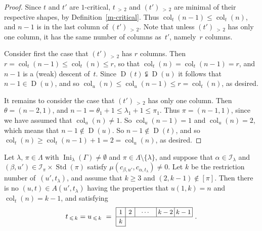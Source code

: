 \documentclass[ALCO,ThmDefs,Unicode,epreuves]{cedram}
\DeclareMathOperator{\Ini}{Ini}
\DeclareMathOperator{\col}{col}
\newcommand{\morethan}[2]{#1\,{_{>\,#2}}}
\newcommand{\Lessthan}[2]{#1\,{_{\leqslant\,#2}}}
\DeclareMathOperator{\STD}{Std}
\DeclareMathOperator{\D}{D}
\begin{document}
\begin{proof}
Since $t$ and $t'$ are $1$-critical, $\morethan t2$ and $\morethan{(t')}2$ are
minimal of their respective shapes, by Definition~\ref{m-critical}. Thus
$\col_t(n-1)\leqslant\col_t(n)$, and $n-1$ is in the last column of $\morethan{(t')}2$.
Note that unless $\morethan{(t')}2$ has only one column, it has the same number of
columns as~$t'$, namely~$r$ columns.

Consider first the case that $\morethan{(t')}2$ has $r$ columns. Then
$r=\col_t(n-1)\leqslant\col_t(n)\leqslant r$, so that $\col_t(n)=\col_t(n-1)=r$,
and $n-1$ is a (weak) descent of~$t$. Since $\D(t)\subsetneqq\D(u)$ it follows that
$n-1\in\D(u)$, and so $\col_u(n)\leqslant\col_u(n-1)\leqslant r=\col_t(n)$,
as desired.

It remains to consider the case that $\morethan{(t')}2$ has only one column.
Then $\theta=(n-2,1)$, and $n-1=\theta_1+1\leqslant\lambda_1+1\leqslant\pi_1$.
Thus $\pi=(n-1,1)$, since we have assumed that $\col_u(n)\ne 1$.
So $\col_u(n-1)=1$ and $\col_u(n)=2$, which means that $n-1\notin\D(u)$.
So $n-1\notin\D(t)$, and so $\col_t(n)\geqslant\col_t(n-1)+1=2=\col_u(n)$,
as desired.
\end{proof}

\begin{lemm}\label{k-minimalonerow}
Let $\lambda,\,\pi\in\Lambda$ with $\Ini_\lambda(\Gamma)\ne\emptyset$ and
$\pi\in\Lambda\setminus\{\lambda\}$, and suppose that $\alpha\in\mathcal I_\lambda$
and $(\beta,u')\in\mathcal I_\pi\times\STD(\pi)$ satisfy
$\mu(c_{\beta,u'},c_{\alpha,t_\lambda})\neq 0$.
Let $k$ be the restriction number of~$(u',t_\lambda)$, and assume that
$k\geqslant 3$ and $(2,k-1)\notin[\pi]$. Then there is no $(u,t)\in A(u',t_\lambda)$
having the properties that $u(1,k)=n$ and $\col_t(n)=k-1$, and satisfying
\[
\Lessthan tk=\Lessthan uk\ =\ \vcenter{\offinterlineskip\small
\hbox{\vrule height 0.4 pt depth 0 pt width 108.4pt}
\hbox{\vrule height 9 pt depth 4 pt\hbox to 13pt{\hfil$1$\hfil}\vrule
\hbox to 13pt{\hfil$2$\hfil}\vrule\hbox to 30pt{\hfil$\cdots$\hfil}\vrule
\hbox to 25pt{\hfil$k-2$\hfil}\vrule
\hbox to 25pt{\hfil$k-1$\hfil}\vrule}
\hrule
\hbox{\vrule height 9 pt depth 4 pt\hbox to 13pt{\hfil$k$\hfil}\vrule}
\hrule width 14.2 pt}\ .
\]
\end{lemm}
\end{document}
